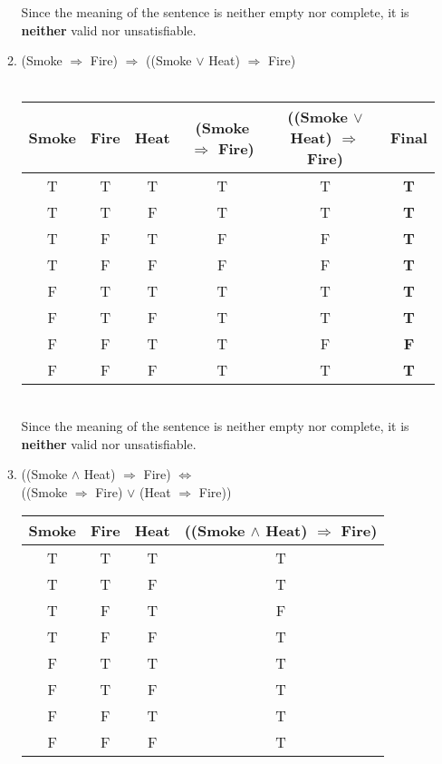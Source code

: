 \documentclass[12pt]{article}
\begin{document}
\begin{enumerate}
\begin{enumerate}
		Since the meaning of the sentence is neither empty nor complete, it is \textbf{neither} valid nor unsatisfiable.
		
		\item (Smoke $\Rightarrow$ Fire) $\Rightarrow$ ((Smoke $\lor$ Heat) $\Rightarrow$ Fire) 
		\\
		\\
		\begin{tabular}{ | c | c | c | c | c | >{\bf}c |}
		\hline
		Smoke & Fire & Heat & (Smoke $\Rightarrow$ Fire) & ((Smoke $\lor$ Heat) $\Rightarrow$ Fire) & Final  \\
		\hline 
		T & T & T & T & T & T \\
		\hline 
		T & T & F & T & T & T \\
		\hline 
		T & F & T & F & F & T \\
		\hline 
		T & F & F & F & F & T \\
		\hline
		F & T & T & T & T & T \\
		\hline 
		F & T & F & T & T & T \\
		\hline 
		F & F & T & T & F & F \\
		\hline 
		F & F & F & T & T & T \\
		\hline
		\end{tabular}
		\\
		
		Since the meaning of the sentence is neither empty nor complete, it is \textbf{neither} valid nor unsatisfiable.
		
		\item ((Smoke $\land$ Heat) $\Rightarrow$ Fire) $\iff$  \\
			((Smoke $\Rightarrow$ Fire) $\lor$ (Heat $\Rightarrow$ Fire)) 
		
		\begin{tabular}{ | c | c | c | c |}
		\hline
		Smoke & Fire & Heat & ((Smoke $\land$ Heat) $\Rightarrow$ Fire)  \\
		\hline 
		T & T & T & T  \\
		\hline 
		T & T & F & T  \\
		\hline 
		T & F & T & F  \\
		\hline 
		T & F & F & T  \\
		\hline 
		F & T & T & T  \\
		\hline 
		F & T & F & T  \\
		\hline 
		F & F & T & T  \\
		\hline 
		F & F & F & T  \\
		\hline 
		\end{tabular}
		\\


\end{enumerate}
\end{enumerate}
\end{document}
